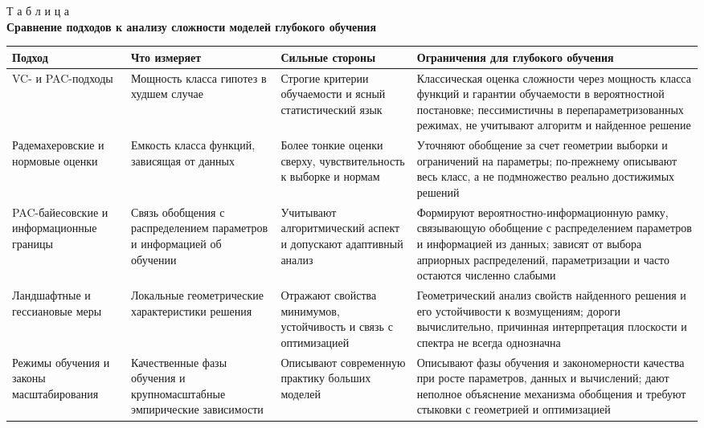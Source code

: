 \begin{table}[htbp]
\label{tab:comparison}
\begin{flushright}
{Т а б л и ц а \thetable}\\
\centering
\textbf{Сравнение подходов к анализу сложности моделей глубокого обучения}
\end{flushright}
\centering
\scriptsize
\setlength{\tabcolsep}{3pt}
\begin{tabular}{|>{\raggedright\arraybackslash}m{1.0in}|>{\raggedright\arraybackslash}m{1.15in}|>{\raggedright\arraybackslash}m{1.45in}|>{\raggedright\arraybackslash}m{1.65in}|}
\hline
Подход & Что измеряет & Сильные стороны & Ограничения для глубокого обучения \\
\hline
VC- и PAC-подходы & Мощность класса гипотез в худшем случае & Строгие критерии обучаемости и ясный статистический язык & Классическая оценка сложности через мощность класса функций и гарантии обучаемости в вероятностной постановке; пессимистичны в перепараметризованных режимах, не учитывают алгоритм и найденное решение \\
\hline
Радемахеровские и нормовые оценки & Емкость класса функций, зависящая от данных & Более тонкие оценки сверху, чувствительность к выборке и нормам & Уточняют обобщение за счет геометрии выборки и ограничений на параметры; по-прежнему описывают весь класс, а не подмножество реально достижимых решений \\
\hline
PAC-байесовские и информационные границы & Связь обобщения с распределением параметров и информацией об обучении & Учитывают алгоритмический аспект и допускают адаптивный анализ & Формируют вероятностно-информационную рамку, связывающую обобщение с распределением параметров и информацией из данных; зависят от выбора априорных распределений, параметризации и часто остаются численно слабыми \\
\hline
Ландшафтные и гессиановые меры & Локальные геометрические характеристики решения & Отражают свойства минимумов, устойчивость и связь с оптимизацией & Геометрический анализ свойств найденного решения и его устойчивости к возмущениям; дороги вычислительно, причинная интерпретация плоскости и спектра не всегда однозначна \\
\hline
Режимы обучения и законы масштабирования & Качественные фазы обучения и крупномасштабные эмпирические зависимости & Описывают современную практику больших моделей & Описывают фазы обучения и закономерности качества при росте параметров, данных и вычислений; дают неполное объяснение механизма обобщения и требуют стыковки с геометрией и оптимизацией \\
\hline
\end{tabular}
\end{table}

